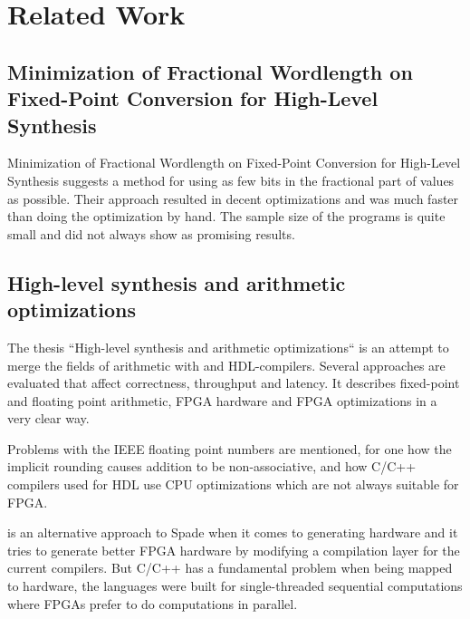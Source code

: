 



\chapter{Related Work}

\section{Minimization of Fractional Wordlength on Fixed-Point Conversion for High-Level Synthesis}
Minimization of Fractional Wordlength on Fixed-Point Conversion for High-Level Synthesis suggests a method for using as few bits in the fractional part of values as possible. Their approach resulted in decent optimizations and was much faster than doing the optimization by hand. The sample size of the programs is quite small and did not always show as promising results.

\cite{src:MinOfFrac}

\section{High-level synthesis and arithmetic optimizations}
The thesis ``High-level synthesis and arithmetic optimizations`` is an attempt to merge the fields of arithmetic with and HDL-compilers. Several approaches are evaluated that affect correctness, throughput and latency. It describes fixed-point and floating point arithmetic, FPGA hardware and FPGA optimizations in a very clear way.

Problems with the IEEE floating point numbers are mentioned, for one how the implicit rounding causes addition to be non-associative, and how C/C++ compilers used for HDL use CPU optimizations which are not always suitable for FPGA.

\citeauthor{src:HLSandOpt} is an alternative approach to Spade when it comes to generating hardware and it tries to generate better FPGA hardware by modifying a compilation layer for the current compilers. But C/C++ has a fundamental problem when being mapped to hardware, the languages were built for single-threaded sequential computations where FPGAs prefer to do computations in parallel.

